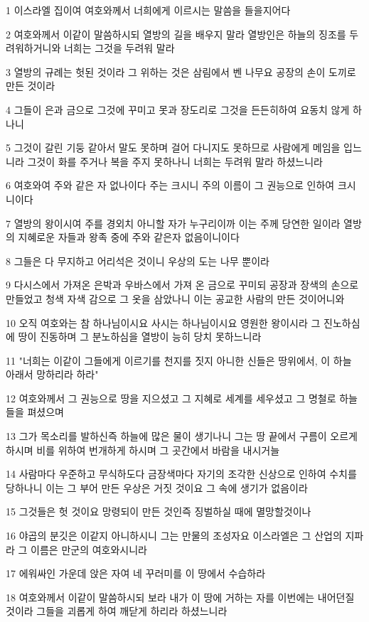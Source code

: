 \par 1 이스라엘 집이여 여호와께서 너희에게 이르시는 말씀을 들을지어다
\par 2 여호와께서 이같이 말씀하시되 열방의 길을 배우지 말라 열방인은 하늘의 징조를 두려워하거니와 너희는 그것을 두려워 말라
\par 3 열방의 규례는 헛된 것이라 그 위하는 것은 삼림에서 벤 나무요 공장의 손이 도끼로 만든 것이라
\par 4 그들이 은과 금으로 그것에 꾸미고 못과 장도리로 그것을 든든히하여 요동치 않게 하나니
\par 5 그것이 갈린 기둥 같아서 말도 못하며 걸어 다니지도 못하므로 사람에게 메임을 입느니라 그것이 화를 주거나 복을 주지 못하나니 너희는 두려워 말라 하셨느니라
\par 6 여호와여 주와 같은 자 없나이다 주는 크시니 주의 이름이 그 권능으로 인하여 크시니이다
\par 7 열방의 왕이시여 주를 경외치 아니할 자가 누구리이까 이는 주께 당연한 일이라 열방의 지혜로운 자들과 왕족 중에 주와 같은자 없음이니이다
\par 8 그들은 다 무지하고 어리석은 것이니 우상의 도는 나무 뿐이라
\par 9 다시스에서 가져온 은박과 우바스에서 가져 온 금으로 꾸미되 공장과 장색의 손으로 만들었고 청색 자색 감으로 그 옷을 삼았나니 이는 공교한 사람의 만든 것이어니와
\par 10 오직 여호와는 참 하나님이시요 사시는 하나님이시요 영원한 왕이시라 그 진노하심에 땅이 진동하며 그 분노하심을 열방이 능히 당치 못하느니라
\par 11 "너희는 이같이 그들에게 이르기를 천지를 짓지 아니한 신들은 땅위에서, 이 하늘 아래서 망하리라 하라"
\par 12 여호와께서 그 권능으로 땅을 지으셨고 그 지혜로 세계를 세우셨고 그 명철로 하늘들을 펴셨으며
\par 13 그가 목소리를 발하신즉 하늘에 많은 물이 생기나니 그는 땅 끝에서 구름이 오르게 하시며 비를 위하여 번개하게 하시며 그 곳간에서 바람을 내시거늘
\par 14 사람마다 우준하고 무식하도다 금장색마다 자기의 조각한 신상으로 인하여 수치를 당하나니 이는 그 부어 만든 우상은 거짓 것이요 그 속에 생기가 없음이라
\par 15 그것들은 헛 것이요 망령되이 만든 것인즉 징벌하실 때에 멸망할것이나
\par 16 야곱의 분깃은 이같지 아니하시니 그는 만물의 조성자요 이스라엘은 그 산업의 지파라 그 이름은 만군의 여호와시니라
\par 17 에워싸인 가운데 앉은 자여 네 꾸러미를 이 땅에서 수습하라
\par 18 여호와께서 이같이 말씀하시되 보라 내가 이 땅에 거하는 자를 이번에는 내어던질 것이라 그들을 괴롭게 하여 깨닫게 하리라 하셨느니라
